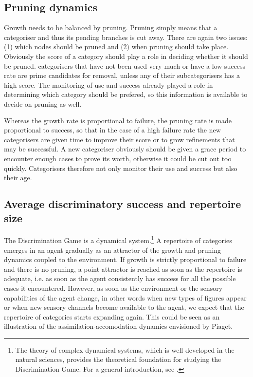 \subsection{Pruning dynamics}

Growth needs to be balanced by pruning. Pruning simply means
that a categoriser and thus its pending branches is 
cut away. There are again two
issues: (1) which nodes should be pruned and
(2) when pruning should take place. 
Obviously the score of a category should play a role
in deciding whether it should be pruned. 
categorisers that have not been used very much or have a low
success rate are prime candidates for removal, unless
any of their subcategorisers has a high score. The 
monitoring of use and success already played a role in 
determining which category should be prefered, so this
information is available to decide on pruning as well. 

Whereas the growth rate is proportional to failure, the pruning
rate is made proportional to success, so that 
in the case of a high failure rate the new categorisers are given
time to improve their score or to grow refinements that may be 
successful. A new categoriser obviously should be given
a grace period to encounter enough cases to prove
its worth, otherwise it could be cut out too quickly. Categorisers 
therefore not only monitor their use and success but 
also their age. 

\subsection{Average discriminatory success and repertoire size}

The Discrimination Game is a dynamical system.\footnote{
The theory of complex dynamical systems, which is well 
developed in the natural sciences, provides the 
theoretical foundation for studying the Discrimination
Game. For a general introduction, see \cite{Peitgen:1992}.} A repertoire of
categories emerges in an agent gradually as an attractor of the
growth and pruning dynamics coupled to 
the environment. If growth is strictly proportional to failure
and there is no pruning, a point attractor
is reached as soon as the repertoire
is adequate, i.e. as soon 
as the agent consistently has success
for all the possible cases it encountered. However, 
as soon as the environment or the sensory capabilities of 
the agent change, in other words when new types of 
figures appear or when new sensory channels become available
to the agent, we expect that the repertoire of categories starts
expanding again. This could be seen as an illustration  of the
assimilation-accomodation dynamics envisioned by Piaget. 


